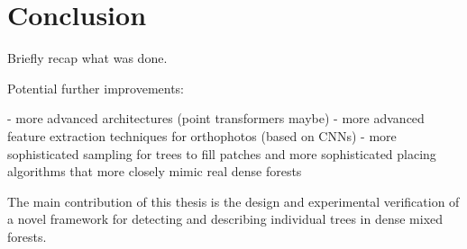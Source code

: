 \chapter{Conclusion}\label{cap:conclusion}


Briefly recap what was done.

Potential further improvements:

- more advanced architectures (point transformers maybe)
- more advanced feature extraction techniques for orthophotos (based on CNNs)
- more sophisticated sampling for trees to fill patches and more sophisticated placing algorithms that more closely mimic real dense forests

The main contribution of  this thesis is the design and experimental verification of a novel framework for detecting and describing individual trees in dense mixed forests.